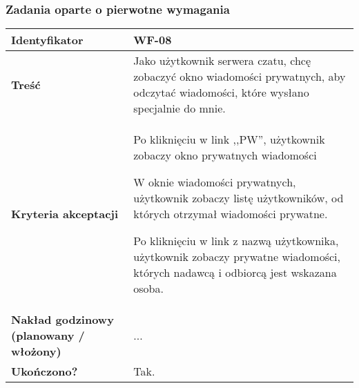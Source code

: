 \subsubsection{Zadania oparte o pierwotne wymagania}

\begin{tabular}{ | l | l | }
	\hline
		\textbf{Identyfikator} &
		WF-08
		\\

	\hline
		\textbf{Treść} & \parbox[t]{11.5cm}{\strut
			Jako użytkownik serwera czatu, chcę zobaczyć
			okno wiadomości prywatnych, aby odczytać wiadomości,
			które wysłano specjalnie do mnie.
		\strut}\\


	\hline
		\parbox[t]{4cm}{\textbf{Kryteria akceptacji}} & \parbox[t]{11.5cm}{\strut
			\begin{enumreq}
				\item Po kliknięciu w link ,,PW'', użytkownik
				zobaczy okno prywatnych wiadomości
				\item W oknie wiadomości prywatnych, użytkownik
				zobaczy listę użytkowników, od których otrzymał
				wiadomości prywatne.
				\item Po kliknięciu w link z nazwą użytkownika,
				użytkownik zobaczy prywatne wiadomości, których
				nadawcą i odbiorcą jest wskazana osoba.
			\end{enumreq}
			\strut}
		\\
    \hline
      \parbox[t]{4cm}{\textbf{Nakład godzinowy (planowany / włożony)}} &
      \parbox[t]{11.5cm}{\strut
        ...
      \strut}\\

      \hline
        \parbox[t]{4cm}{\textbf{Ukończono?}} &
        \parbox[t]{11.5cm}{\strut
          Tak.
        \strut}\\
	\hline
\end{tabular}

\vspace{1em}

